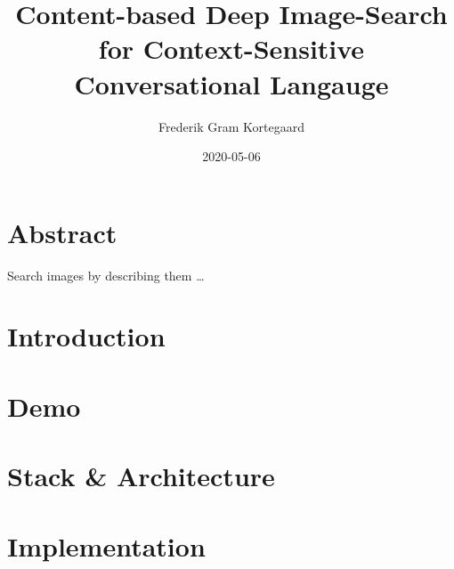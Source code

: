 \documentclass{article}
\title{Content-based Deep Image-Search for Context-Sensitive Conversational Langauge}
\date{2020-05-06}
\author{Frederik Gram Kortegaard}
\begin{document}
\maketitle
{}
\newpage
\tableofcontents
\newpage
{}

\section{Abstract}
Search images by describing them \dots

\section{Introduction}
\section{Demo}
\section{Stack \& Architecture}
\section{Implementation}
\end{document}
